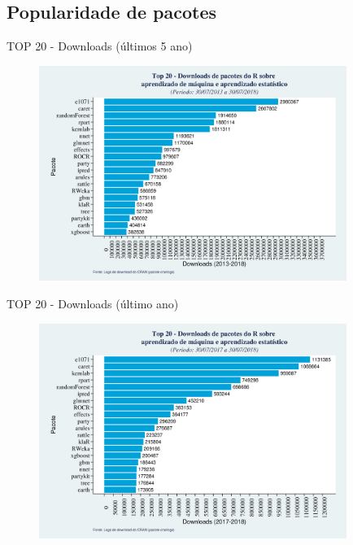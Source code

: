 \documentclass[12pt,ignorenonframetext,aspectratio=1610]{beamer}
\begin{document}
\subsection{Popularidade de pacotes}

\begin{frame}[t]{TOP 20 - Downloads (últimos 5 ano)}
	
	\begin{figure}[H]
		\centering
		\includegraphics[width=10cm, height=7cm]{Fig/dwl_5year.jpeg}
	\end{figure}
	
\end{frame}

\begin{frame}[t]{TOP 20 - Downloads (último ano)}
	
	\begin{figure}[H]
		\centering
		\includegraphics[width=10cm, height=7cm]{Fig/dwl_year.jpeg}
	\end{figure}
	
\end{frame}	
\end{document}
